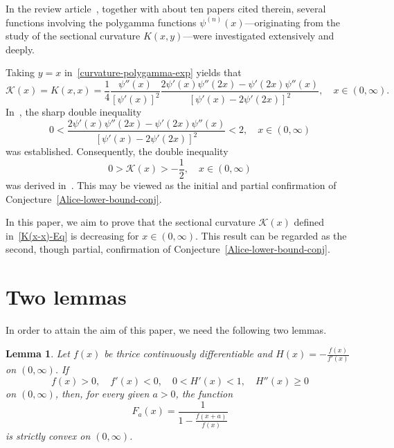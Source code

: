 \documentclass[reqno]{amsart}%
\theoremstyle{plain}
\newtheorem{lem}{Lemma}
\theoremstyle{remark}
\begin{document}
In the review article~\cite{manifold-gamma.tex}, together with about ten papers cited therein, several functions involving the polygamma functions $\psi^{(n)}(x)$---originating from the study of the sectional curvature $K(x,y)$---were investigated extensively and deeply.
\par
Taking $y=x$ in~\eqref{curvature-polygamma-exp} yields that
\begin{equation}\label{K(x-x)-Eq}
\mathcal{K}(x)=K(x,x)=\frac{1}{4}\frac{\psi''(x)}{[\psi'(x)]^2} \frac{2\psi'(x)\psi''(2x)-\psi'(2x)\psi''(x)}{[\psi'(x)-2\psi'(2x)]^2}, \quad x\in(0,\infty).
\end{equation}
In~\cite[Theorem~4.1]{RIMA-D-20-01130.tex}, the sharp double inequality
\begin{equation}\label{sectional-doub-ineq}
0<\frac{2\psi'(x)\psi''(2x)-\psi'(2x)\psi''(x)}{[\psi'(x)-2\psi'(2x)]^2}<2, \quad x\in(0,\infty)
\end{equation}
was established. Consequently, the double inequality
\begin{equation}\label{sect-curvat-ineq}
0>\mathcal{K}(x)>-\frac{1}{2}, \quad x\in(0,\infty)
\end{equation}
was derived in~\cite[Theorem~5.1]{RIMA-D-20-01130.tex}. This may be viewed as the initial and partial confirmation of Conjecture~\ref{Alice-lower-bound-conj}.
\par
In this paper, we aim to prove that the sectional curvature $\mathcal{K}(x)$ defined in~\eqref{K(x-x)-Eq} is decreasing for $x\in(0,\infty)$. This result can be regarded as the second, though partial, confirmation of Conjecture~\ref{Alice-lower-bound-conj}.

\section{Two lemmas}
In order to attain the aim of this paper, we need the following two lemmas.

\begin{lem}\label{lem:general}
Let $f(x)$ be thrice continuously differentiable and $H(x)=-\frac{f(x)}{f'(x)}$ on $(0,\infty)$. If
$$
f(x)>0,\quad f'(x)<0, \quad 0<H'(x)<1, \quad H''(x)\geq 0
$$
on $(0,\infty)$, then, for every given $a>0$, the function
$$
F_a(x)=\frac{1}{1-\frac{f(x+a)}{f(x)}}
$$
is strictly convex on $(0,\infty)$.
\end{lem}
\end{document}
